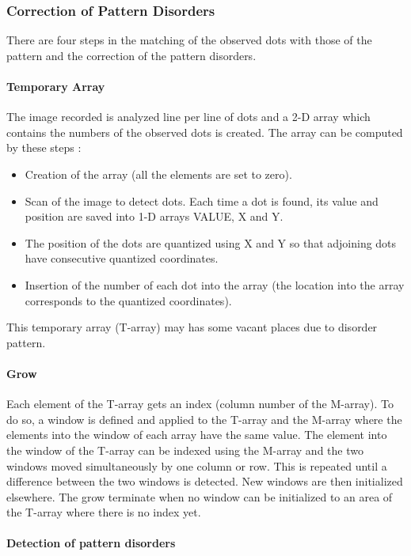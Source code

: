 \subsubsection{Correction of Pattern Disorders}
There are four steps in the matching of the observed dots with those of the pattern and the correction of the pattern disorders.





\paragraph{Temporary Array}
The image recorded is analyzed line per line of dots and a 2-D array which contains the numbers of the observed dots is created. The array can be computed by these steps :
\begin{itemize}
\item Creation of the array (all the elements are set to zero).
\item Scan of the image to detect dots. Each time a dot is found, its value and position are saved into 1-D arrays VALUE, X and Y.
\item The position of the dots are quantized using X and Y so that adjoining dots have consecutive quantized coordinates.
\item Insertion of the number of each dot into the array (the location into the array corresponds to the quantized coordinates).
\end{itemize}

This temporary array (T-array) may has some vacant places due to disorder pattern.

\paragraph{Grow}
Each element of the T-array gets an index (column number of the M-array). To do so, a window is defined and applied to the T-array and the M-array where the elements into the window of each array have the same value. The element into the window of the T-array can be indexed using the M-array and the two windows moved simultaneously by one column or row. This is repeated until a difference between the two windows is detected. New windows are then initialized elsewhere. The grow terminate when no window can be initialized to an area of the T-array where there is no index yet.


\paragraph{Detection of pattern disorders}




